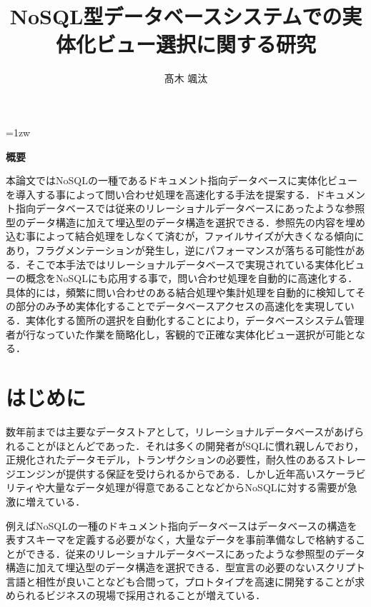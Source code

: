 \documentclass[a4paper,11pt]{ujreport}
\title{NoSQL型データベースシステムでの実体化ビュー選択に関する研究}
\author{髙木 颯汰}
\begin{document}
\maketitle
\thispagestyle{empty}
\newpage

\thispagestyle{empty}
\vspace*{20pt plus 1fil}
\parindent=1zw
\noindent
\begin{center}
	{\bf 概要}
	\vspace{5mm}
\end{center}
本論文ではNoSQLの一種であるドキュメント指向データベースに実体化ビューを導入する事によって問い合わせ処理を高速化する手法を提案する．ドキュメント指向データベースでは従来のリレーショナルデータベースにあったような参照型のデータ構造に加えて埋込型のデータ構造を選択できる．参照先の内容を埋め込む事によって結合処理をしなくて済むが，ファイルサイズが大きくなる傾向にあり，フラグメンテーションが発生し，逆にパフォーマンスが落ちる可能性がある．そこで本手法ではリレーショナルデータベースで実現されている実体化ビューの概念をNoSQLにも応用する事で，問い合わせ処理を自動的に高速化する．具体的には，頻繁に問い合わせのある結合処理や集計処理を自動的に検知してその部分のみ予め実体化することでデータベースアクセスの高速化を実現している．実体化する箇所の選択を自動化することにより，データベースシステム管理者が行なっていた作業を簡略化し，客観的で正確な実体化ビュー選択が可能となる．

\par
\vspace{0pt plus 1fil}
\newpage

\tableofcontents
\listoffigures
\listoftables

\pagebreak \setcounter{page}{1}


\chapter{はじめに}
\label{chap:Introduction}

数年前までは主要なデータストアとして，リレーショナルデータベースがあげられることがほとんどであった．それは多くの開発者がSQLに慣れ親しんでおり，正規化されたデータモデル，トランザクションの必要性，耐久性のあるストレージエンジンが提供する保証を受けられるからである\cite{Sky株式会社201212}．しかし近年高いスケーラビリティや大量なデータ処理が得意であることなどからNoSQLに対する需要が急激に増えている．

例えばNoSQLの一種のドキュメント指向データベースはデータベースの構造を表すスキーマを定義する必要がなく，大量なデータを事前準備なしで格納することができる．従来のリレーショナルデータベースにあったような参照型のデータ構造に加えて埋込型のデータ構造を選択できる．型宣言の必要のないスクリプト言語と相性が良いことなども合間って，プロトタイプを高速に開発することが求められるビジネスの現場で採用されることが増えている\cite{渡部201602}．
\end{document}
